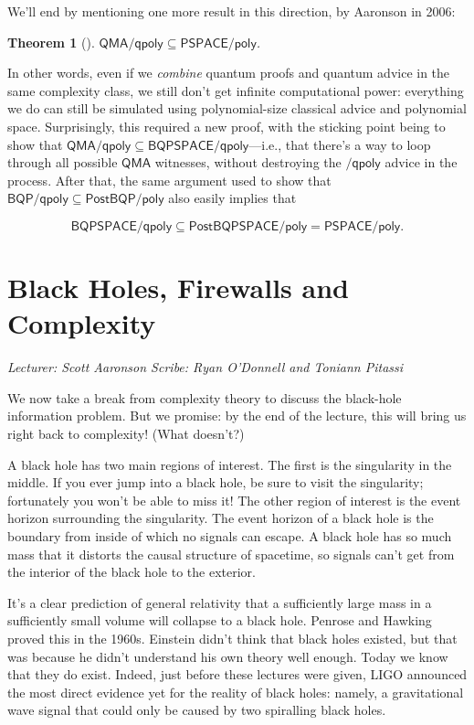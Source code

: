 \documentclass[11pt]{report}
\theoremstyle{plain}
\newtheorem{theorem}{Theorem}[section]
\theoremstyle{definition}
\newcommand{\lecture}[3]{%
  \chapter{#3}%
  \vspace{-5ex}%
  \textit{Lecturer: #1 \hfill Scribe: #2}\par%
  \vspace{1ex}\titlerule\vspace{2ex}}
\begin{document}
We'll end by mentioning one more result in this direction, by Aaronson \cite{aar:qmaqpoly} in 2006:

\begin{theorem}[\cite{aar:qmaqpoly}]
\label{qmaqpolythm}
$\mathsf{QMA/qpoly}\subseteq \mathsf{PSPACE/poly}$.
\end{theorem}

In other words, even if we {\em combine} quantum proofs and quantum advice in the same complexity class, we still don't get infinite computational power: everything we do can still be simulated using polynomial-size classical advice and polynomial space.  Surprisingly, this required a new proof, with the sticking point being to show that $\mathsf{QMA/qpoly}\subseteq \mathsf{BQPSPACE/qpoly}$---i.e., that there's a way to loop through all possible $\mathsf{QMA}$ witnesses, without destroying the $\mathsf{/qpoly}$ advice in the process.  After that, the same argument used to show that $\mathsf{BQP/qpoly}\subseteq \mathsf{PostBQP/poly}$ also easily implies that

$$\mathsf{BQPSPACE/qpoly} \subseteq \mathsf{PostBQPSPACE/poly} = \mathsf{PSPACE/poly}.$$

\lecture{Scott Aaronson}{Ryan O'Donnell and Toniann Pitassi}{Black Holes, Firewalls and Complexity}

We now take a break from complexity theory to discuss the black-hole information problem.  But we promise: by the end of the lecture, this will bring us right back to complexity!  (What doesn't?)

A black hole has two main regions of interest.
The first is the singularity in the middle.
If you ever jump into a black hole, be sure to visit the singularity;
fortunately you won't be able to miss it!
The other region of interest is the event horizon surrounding the singularity.
The event horizon of a black hole is the boundary
from inside of which no signals can escape. A black hole has so much mass that it distorts
the causal structure of spacetime, so signals can't get from the interior of the
black hole to the exterior.

It's a clear prediction of general relativity that a
sufficiently large mass in a sufficiently small volume
will collapse to a black hole.  Penrose and Hawking proved this in the 1960s.
Einstein didn't think that black holes existed, but that was because
he didn't understand his own theory well enough.
Today we know that they do exist.
Indeed, just before these lectures were given, LIGO announced
the most direct evidence yet for the reality of black holes: namely, a gravitational wave signal that
could only be caused by two spiralling black holes.
\end{document}
